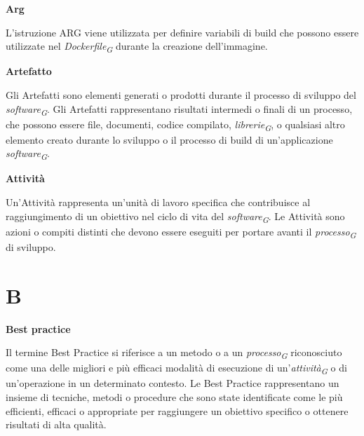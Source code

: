 \documentclass{article}
\begin{document}
\pagebreak

\textbf{Arg}

\vspace{0.1cm}

L’istruzione ARG viene utilizzata per definire variabili di build che possono essere utilizzate nel \textit{Dockerfile}\textsubscript{\textit{G}} durante la creazione dell'immagine. 

\vspace{0.4cm}

\textbf{Artefatto}

\vspace{0.1cm}

Gli Artefatti sono elementi generati o prodotti durante il processo di sviluppo del \textit{software}\textsubscript{\textit{G}}. Gli Artefatti rappresentano risultati intermedi o finali di un processo, che possono essere file, documenti, codice compilato, \textit{librerie}\textsubscript{\textit{G}}, o qualsiasi altro elemento creato durante lo sviluppo o il processo di build di un'applicazione \textit{software}\textsubscript{\textit{G}}.

\vspace{0.4cm}

\textbf{Attività}

\vspace{0.1cm}

Un'Attività rappresenta un'unità di lavoro specifica che contribuisce al raggiungimento di un obiettivo nel ciclo di vita del \textit{software}\textsubscript{\textit{G}}. Le Attività sono azioni o compiti distinti che devono essere eseguiti per portare avanti il \textit{processo}\textsubscript{\textit{G}} di sviluppo.

\pagebreak
\section*{B}

\vspace{0.4cm}
\textbf{Best practice}

\vspace{0.1cm}

Il termine Best Practice si riferisce a un metodo o a un \textit{processo}\textsubscript{\textit{G}} riconosciuto come una delle migliori e più efficaci modalità di esecuzione di un'\textit{attività}\textsubscript{\textit{G}} o di un'operazione in un determinato contesto. Le Best Practice rappresentano un insieme di tecniche, metodi o procedure che sono state identificate come le più efficienti, efficaci o appropriate per raggiungere un obiettivo specifico o ottenere risultati di alta qualità.
\end{document}
